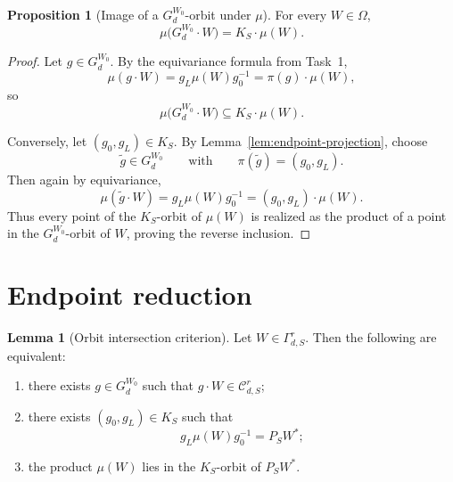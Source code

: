 \documentclass{article}
\theoremstyle{definition}
\newtheorem{proposition}[theorem]{Proposition}
\newtheorem{lemma}[theorem]{Lemma}
\begin{document}
\begin{proposition}[Image of a $G_d^{W_0}$-orbit under $\mu$]\label{prop:image-of-orbit}
For every $W\in \Omega$,
\[
\mu\bigl(G_d^{W_0}\cdot W\bigr)=K_S\cdot \mu(W).
\]
\end{proposition}

\begin{proof}
Let $g\in G_d^{W_0}$. By the equivariance formula from Task~1,
\[
\mu(g\cdot W)=g_L\mu(W)g_0^{-1}=\pi(g)\cdot \mu(W),
\]
so
\[
\mu\bigl(G_d^{W_0}\cdot W\bigr)\subseteq K_S\cdot \mu(W).
\]

Conversely, let $(g_0,g_L)\in K_S$. By Lemma~\ref{lem:endpoint-projection}, choose
\[
\widetilde g\in G_d^{W_0}
\qquad\text{with}\qquad
\pi(\widetilde g)=(g_0,g_L).
\]
Then again by equivariance,
\[
\mu(\widetilde g\cdot W)=g_L\mu(W)g_0^{-1}=(g_0,g_L)\cdot \mu(W).
\]
Thus every point of the $K_S$-orbit of $\mu(W)$ is realized as the product of a point in the $G_d^{W_0}$-orbit of $W$, proving the reverse inclusion.
\end{proof}

\section{Endpoint reduction}

\begin{lemma}[Orbit intersection criterion]\label{lem:orbit-intersection-criterion}
Let $W\in \Gamma_{d,S}^r$. Then the following are equivalent:
\begin{enumerate}
\item there exists $g\in G_d^{W_0}$ such that $g\cdot W\in \mathcal C_{d,S}^r$;
\item there exists $(g_0,g_L)\in K_S$ such that
\[
g_L\mu(W)g_0^{-1}=P_SW^\ast;
\]
\item the product $\mu(W)$ lies in the $K_S$-orbit of $P_SW^\ast$.
\end{enumerate}
\end{lemma}
\end{document}
